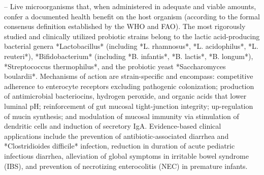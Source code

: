 -- Live microorganisms that, when administered in adequate and viable amounts, confer a documented health benefit on the host organism (according to the formal consensus definition established by the WHO and FAO). The most rigorously studied and clinically utilized probiotic strains belong to the lactic acid-producing bacterial genera *Lactobacillus* (including *L. rhamnosus*, *L. acidophilus*, *L. reuteri*), *Bifidobacterium* (including *B. infantis*, *B. lactis*, *B. longum*), *Streptococcus thermophilus*, and the probiotic yeast *Saccharomyces boulardii*. Mechanisms of action are strain-specific and encompass: competitive adherence to enterocyte receptors excluding pathogenic colonization; production of antimicrobial bacteriocins, hydrogen peroxide, and organic acids that lower luminal pH; reinforcement of gut mucosal tight-junction integrity; up-regulation of mucin synthesis; and modulation of mucosal immunity via stimulation of dendritic cells and induction of secretory IgA. Evidence-based clinical applications include the prevention of antibiotic-associated diarrhea and *Clostridioides difficile* infection, reduction in duration of acute pediatric infectious diarrhea, alleviation of global symptoms in irritable bowel syndrome (IBS), and prevention of necrotizing enterocolitis (NEC) in premature infants.

